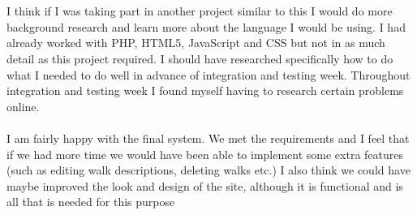 \documentclass[12pt, portrait]{article}
\begin{document}
~\\\\
I think if I was taking part in another project similar to this I would do more background research and learn more about the language I would be using. I had already worked with PHP, HTML5, JavaScript and CSS but not in as much detail as this project required. I should have researched specifically how to do what I needed to do well in advance of integration and testing week. Throughout integration and testing week I found myself having to research certain problems online. ~\\\\
I am fairly happy with the final system. We met the requirements and I feel that if we
had more time we would have been able to implement some extra features (such as
editing walk descriptions, deleting walks etc.) I also think we could have maybe
improved the look and design of the site, although it is functional and is all that is
needed for this purpose
\end{document}
